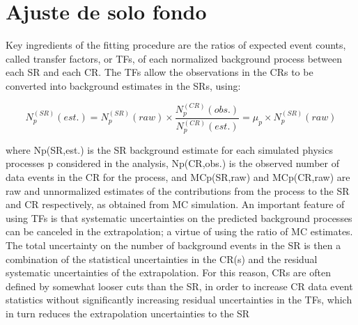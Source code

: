 



\section{Ajuste de solo fondo}

Key ingredients of the fitting procedure are the ratios of expected event counts, called transfer
factors, or TFs, of each normalized background process between each SR and each CR. The TFs
allow the observations in the CRs to be converted into background estimates in the SRs, using:

\begin{equation}
    N^{(SR)}_{p}(est.) = N^{(SR)}_{p}(raw) \times \frac{N^{(CR)}_{p}(obs.)}{N^{(CR)}_{p}(est.)} = \mu_{p} \times N^{(SR)}_{p}(raw)
\end{equation}

where Np(SR,est.) is the SR background estimate for each simulated physics processes p considered
in the analysis, Np(CR,obs.) is the observed number of data events in the CR for the process, and
MCp(SR,raw) and MCp(CR,raw) are raw and unnormalized estimates of the contributions from
the process to the SR and CR respectively, as obtained from MC simulation. An important feature of using TFs is that systematic uncertainties on the predicted background
processes can be canceled in the extrapolation; a virtue of using the ratio of MC estimates. The total uncertainty on the number of background events in the SR is then a combination of the
statistical uncertainties in the CR(s) and the residual systematic uncertainties of the extrapolation.
For this reason, CRs are often defined by somewhat looser cuts than the SR, in order to increase
CR data event statistics without significantly increasing residual uncertainties in the TFs, which in
turn reduces the extrapolation uncertainties to the SR
